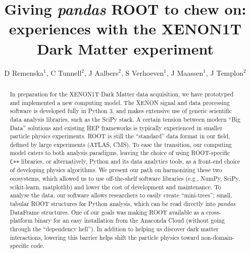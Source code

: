 \documentclass[a4paper]{jpconf}
\begin{document}
\def\code#1{\texttt{#1}}
\title{Giving \textit{pandas} ROOT to chew on: experiences with the XENON1T Dark Matter experiment}

\author{D Remenska$^{1}$, C Tunnell$^{2}$, J Aalbers$^{2}$, S Verhoeven$^{1}$, J Maassen$^{1}$, \newline J Templon$^{2}$}
\address{$^{1}$Netherlands eScience Center, Science Park 140, Amsterdam, The 
Netherlands}
\address{$^{2}$National Institute for High Energy Physics (NIKHEF), Science 
Park 
105, Amsterdam, The Netherlands}

\begin{abstract}
In preparation for the XENON1T Dark Matter data acquisition, 
we have prototyped and implemented a new computing model. 
The XENON signal and data processing software is developed fully in Python 3, and makes extensive use of generic scientific data analysis libraries, such as the SciPy stack.
A certain tension between modern ``Big Data'' solutions and 
existing HEP frameworks is typically experienced in smaller particle physics experiments.
ROOT is still the ``standard'' data format in our field, defined by large experiments (ATLAS, CMS).
To ease the transition, our computing model caters to both analysis paradigms, leaving the choice of using ROOT-specific \texttt{C++} libraries, 
or alternatively, Python and its data analytics tools, as a front-end choice
of developing physics algorithms. 
We present our path on harmonizing these two ecosystems, which allowed us to use off-the-shelf software libraries
(e.g., NumPy, SciPy, scikit-learn, matplotlib) and lower the cost of development and maintenance. 
To analyse the data, our software allows researchers to easily create “mini-trees”;
small, tabular ROOT structures for Python analysis, which can be read directly into \textit{pandas}
DataFrame structures. One of our goals was making ROOT available as a cross-platform binary for an easy
installation from the Anaconda Cloud (without going through the ``dependency hell'').
In addition to helping us discover dark matter interactions, lowering this barrier helps shift the particle physics
toward non-domain-specific code.


\end{abstract}
\end{document}
